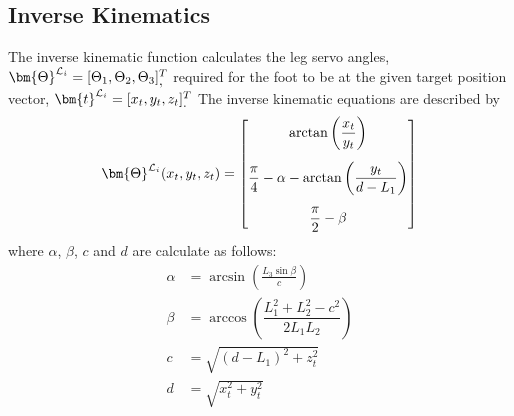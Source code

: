         \newpage
        \subsection{Inverse Kinematics}
            The inverse kinematic function calculates the leg servo angles, \(\bm{\Theta}\inrefframe{\fleg} = [\Theta_1, \Theta_2, \Theta_3]^T_{\displaystyle ,}\) required for the foot to be at the given target position vector, \(\bm{t}\inrefframe{\fleg} = [x_t,y_t,z_t]^T_{\displaystyle .}\) The inverse kinematic equations are described by
            \begin{equation}\label{eq:ik}
                \bm{\Theta}\inrefframe{\fleg}(x_t,y_t,z_t) =
                                    \begin{bmatrix}
                                        \arctan{\left(\dfrac{x_t}{y_t}\right)}\\[0.5cm]
                                        \dfrac{\pi}{4} - \alpha - \arctan{\left(\dfrac{y_t}{d-L_1}\right)}\\[0.5cm]
                                        \dfrac{\pi}{2} - \beta
                                    \end{bmatrix}
            \end{equation}
            where \(\alpha\), \(\beta\), \(c\) and \(d\) are calculate as follows:
            \begin{align}
                \alpha &= \arcsin{\left(\frac{L_3\sin{\beta}}{c}\right)} \label{eq:alpha} \\[0.5cm]
                \beta &= \arccos{\left(\dfrac{L_1^2 + L_2^2 -c^2}{2L_1L_2}\right)}\\[0.5cm]
                c &= \sqrt{(d-L_1)^2+z_t^2}\\[0.5cm]
                d &= \sqrt{x_t^2 + y_t^2} \label{eq:dik}
            \end{align}
